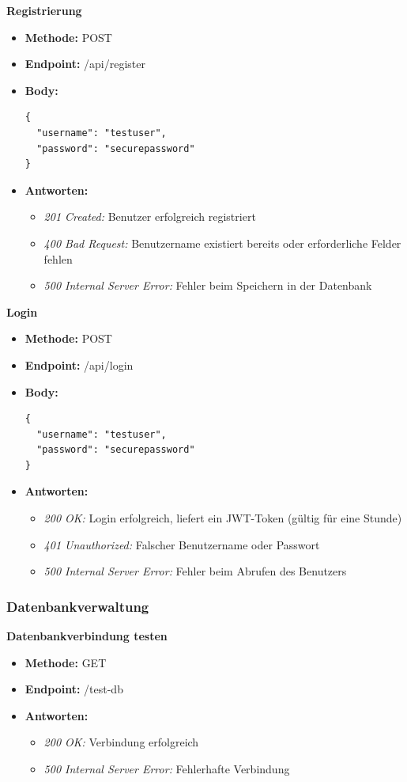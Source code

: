 \textbf{Registrierung}
\begin{itemize}
    \item \textbf{Methode: }POST 
    \item \textbf{Endpoint: }/api/register 
    \item \textbf{Body: } \begin{verbatim}
{
  "username": "testuser",
  "password": "securepassword"
}
    \end{verbatim}
    \item \textbf{Antworten: }
    \begin{itemize}
        \item \textit{201 Created: }Benutzer erfolgreich registriert
        \item \textit{400 Bad Request: }Benutzername existiert bereits oder erforderliche Felder fehlen
        \item \textit{500 Internal Server Error: }Fehler beim Speichern in der Datenbank
    \end{itemize}
\end{itemize}\clearpage
\textbf{Login}
\begin{itemize}
    \item \textbf{Methode: }POST 
    \item \textbf{Endpoint: }/api/login  
    \item \textbf{Body: } \begin{verbatim}
{
  "username": "testuser",
  "password": "securepassword"
}
    \end{verbatim}
    \item \textbf{Antworten: }
    \begin{itemize}
        \item \textit{200 OK: }Login erfolgreich, liefert ein JWT-Token (gültig für eine Stunde)
        \item \textit{401 Unauthorized: }Falscher Benutzername oder Passwort
        \item \textit{500 Internal Server Error: }Fehler beim Abrufen des Benutzers
    \end{itemize}
\end{itemize}


\subsubsection{Datenbankverwaltung}

\textbf{Datenbankverbindung testen}
\begin{itemize}
    \item \textbf{Methode: }GET 
    \item \textbf{Endpoint: }/test-db
    \item \textbf{Antworten: }
    \begin{itemize}
        \item \textit{200 OK: }Verbindung erfolgreich
        \item \textit{500 Internal Server Error: }Fehlerhafte Verbindung
    \end{itemize}
\end{itemize}


